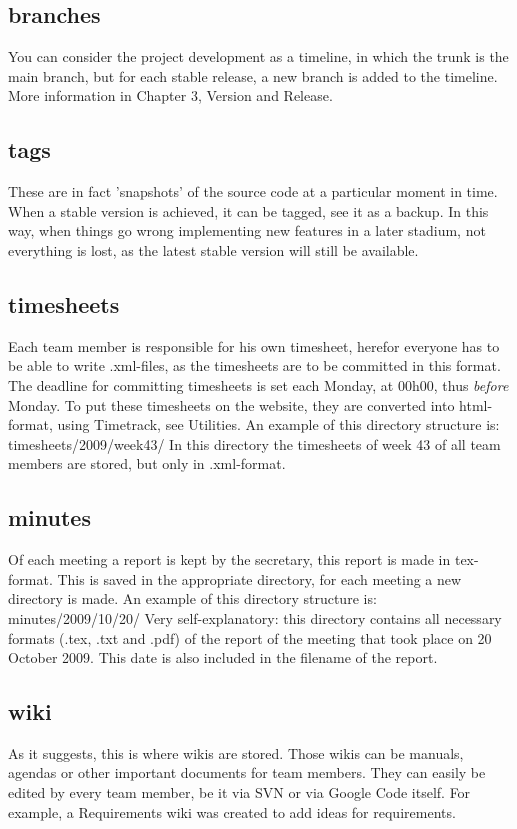 \documentclass{report}
\begin{document}
\subsection{branches}
You can consider the project development as a timeline, in which the trunk is the main branch, but for each stable release, a new branch is added to the timeline.
More information in Chapter 3, Version and Release.
\subsection{tags}
These are in fact 'snapshots' of the source code at a particular moment in time.
When a stable version is achieved, it can be tagged, see it as a backup.
In this way, when things go wrong implementing new features in a later stadium, not everything is lost, as the latest stable version will still be available.
\subsection{timesheets}
Each team member is responsible for his own timesheet, herefor everyone has to be able to write .xml-files, as the timesheets are to be committed in this format.
The deadline for committing timesheets is set each Monday, at 00h00, thus {\it before} Monday.
To put these timesheets on the website, they are converted into html-format, using Timetrack, see Utilities.
An example of this directory structure is:\newline
timesheets/2009/week43/\newline
In this directory the timesheets of week 43 of all team members are stored, but only in .xml-format.
\subsection{minutes}
Of each meeting a report is kept by the secretary, this report is made in tex-format.
This is saved in the appropriate directory, for each meeting a new directory is made.
An example of this directory structure is:\newline
minutes/2009/10/20/\newline
Very self-explanatory: this directory contains all necessary formats (.tex, .txt and .pdf) of the report of the meeting that took place on 20 October 2009.
This date is also included in the filename of the report.
\subsection{wiki}
As it suggests, this is where wikis are stored.
Those wikis can be manuals, agendas or other important documents for team members.
They can easily be edited by every team member, be it via SVN or via Google Code itself.
For example, a Requirements wiki was created to add ideas for requirements.
\end{document}
